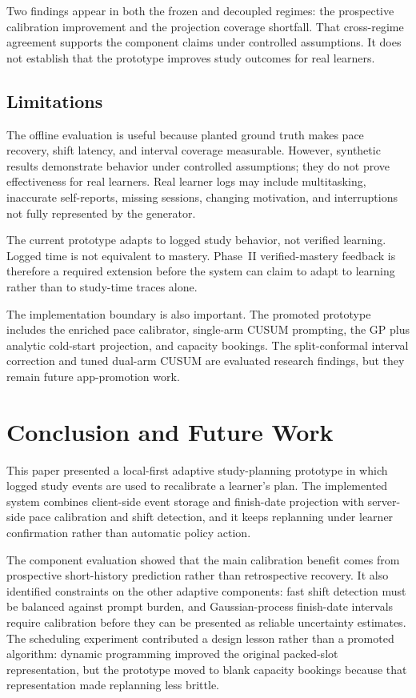 \documentclass[conference]{IEEEtran}
\begin{document}
Two findings appear in both the frozen and decoupled regimes: the prospective calibration improvement and the projection coverage shortfall. That cross-regime agreement supports the component claims under controlled assumptions. It does not establish that the prototype improves study outcomes for real learners.

\subsection{Limitations}
\label{sec:limitations}
The offline evaluation is useful because planted ground truth makes pace recovery, shift latency, and interval coverage measurable. However, synthetic results demonstrate behavior under controlled assumptions; they do not prove effectiveness for real learners. Real learner logs may include multitasking, inaccurate self-reports, missing sessions, changing motivation, and interruptions not fully represented by the generator.

The current prototype adapts to logged study behavior, not verified learning. Logged time is not equivalent to mastery. Phase~II verified-mastery feedback is therefore a required extension before the system can claim to adapt to learning rather than to study-time traces alone.

The implementation boundary is also important. The promoted prototype includes the enriched pace calibrator, single-arm CUSUM prompting, the GP plus analytic cold-start projection, and capacity bookings. The split-conformal interval correction and tuned dual-arm CUSUM are evaluated research findings, but they remain future app-promotion work.

\section{Conclusion and Future Work}
This paper presented a local-first adaptive study-planning prototype in which logged study events are used to recalibrate a learner's plan. The implemented system combines client-side event storage and finish-date projection with server-side pace calibration and shift detection, and it keeps replanning under learner confirmation rather than automatic policy action.

The component evaluation showed that the main calibration benefit comes from prospective short-history prediction rather than retrospective recovery. It also identified constraints on the other adaptive components: fast shift detection must be balanced against prompt burden, and Gaussian-process finish-date intervals require calibration before they can be presented as reliable uncertainty estimates. The scheduling experiment contributed a design lesson rather than a promoted algorithm: dynamic programming improved the original packed-slot representation, but the prototype moved to blank capacity bookings because that representation made replanning less brittle.
\end{document}
